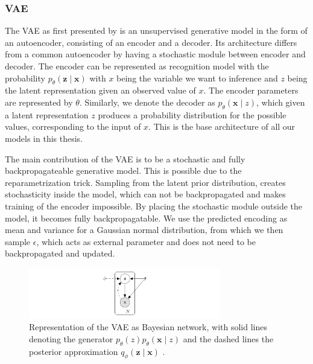 \subsubsection{VAE}
\label{ssection:VAE}



The VAE as first presented by \cite{kingma_auto-encoding_2014} is an unsupervised generative model in the form of an autoencoder, consisting of an encoder and a decoder. Its architecture differs from a common autoencoder by having a stochastic module between encoder and decoder. The encoder can be represented as recognition model with the probability $p_{{\theta}}(\mathbf{z} \mid \mathbf{x})$ with $x$ being the variable we want to inference and $z$ being the latent representation given an observed value of $x$. The encoder parameters are represented by $\theta$. Similarly, we denote the decoder as $p_{{\theta}}(\mathbf{x} \mid z)$, which given a latent representation $z$ produces a probability distribution for the possible values, corresponding to the input of $x$. This is the base architecture of all our models in this thesis.

The main contribution of the VAE is to be a stochastic and fully backpropagateable generative model. This is possible due to the reparametrization trick. Sampling from the latent prior distribution, creates stochasticity inside the model, which can not be backpropagated and makes training of the encoder impossible. By placing the stochastic module outside the model, it becomes fully backpropagatable. We use the predicted encoding as mean and variance for a Gaussian normal distribution, from which we then sample $\epsilon$, which acts as external parameter and does not need to be backpropagated and updated.

\begin{figure}[h]
    \centering
    \includegraphics[width=0.75\textwidth]{data/images/repaTrick.png}
    \caption{Representation of the VAE as Bayesian network, with solid lines denoting the generator $p_{{\theta}}(z)p_{{\theta}}(\mathbf{x} \mid z)$ and the dashed lines the posterior approximation $q_{\phi}(\mathbf{z} \mid \mathbf{x})$ \cite{kingma_auto-encoding_2014}.}
    \label{fig:varinference}
\end{figure}


